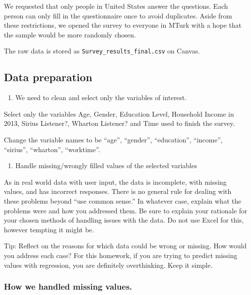 \documentclass[
]{article}
\providecommand{\tightlist}{%
  \setlength{\itemsep}{0pt}\setlength{\parskip}{0pt}}
\begin{document}
We requested that only people in United States answer the questions.
Each person can only fill in the questionnaire once to avoid duplicates.
Aside from these restrictions, we opened the survey to everyone in MTurk
with a hope that the sample would be more randomly chosen.

The raw data is stored as \texttt{Survey\_results\_final.csv} on Canvas.

\hypertarget{data-preparation}{%
\subsection{Data preparation}\label{data-preparation}}

\begin{enumerate}
\def\labelenumi{\arabic{enumi}.}
\tightlist
\item
  We need to clean and select only the variables of interest.
\end{enumerate}

Select only the variables Age, Gender, Education Level, Household Income
in 2013, Sirius Listener?, Wharton Listener? and Time used to finish the
survey.

Change the variable names to be ``age'', ``gender'', ``education'',
``income'', ``sirius'', ``wharton'', ``worktime''.

\begin{enumerate}
\def\labelenumi{\arabic{enumi}.}
\setcounter{enumi}{1}
\tightlist
\item
  Handle missing/wrongly filled values of the selected variables
\end{enumerate}

As in real world data with user input, the data is incomplete, with
missing values, and has incorrect responses. There is no general rule
for dealing with these problems beyond ``use common sense.'' In whatever
case, explain what the problems were and how you addressed them. Be sure
to explain your rationale for your chosen methods of handling issues
with the data. Do not use Excel for this, however tempting it might be.

Tip: Reflect on the reasons for which data could be wrong or missing.
How would you address each case? For this homework, if you are trying to
predict missing values with regression, you are definitely overthinking.
Keep it simple.

\hypertarget{how-we-handled-missing-values.}{%
\subsubsection{How we handled missing
values.}\label{how-we-handled-missing-values.}}
\end{document}
